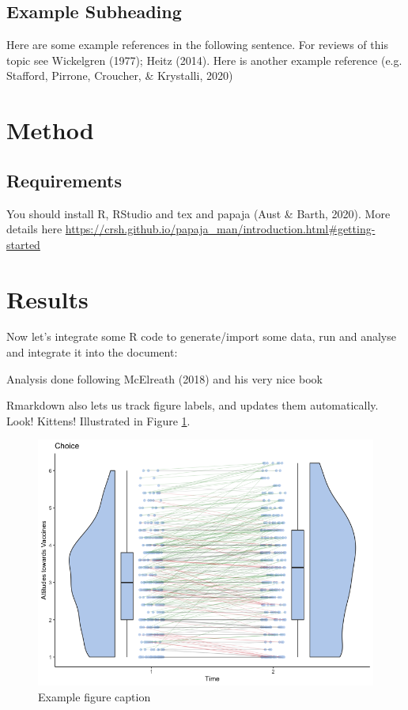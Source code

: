 \documentclass[
  english,
  ,jou,floatsintext]{apa6}
\begin{document}
\hypertarget{example-subheading}{%
\subsection{Example Subheading}\label{example-subheading}}

Here are some example references in the following sentence. For reviews of this topic see Wickelgren (1977); Heitz (2014). Here is another example reference (e.g. Stafford, Pirrone, Croucher, \& Krystalli, 2020)

\hypertarget{method}{%
\section{Method}\label{method}}

\hypertarget{requirements}{%
\subsection{Requirements}\label{requirements}}

You should install R, RStudio and tex and papaja (Aust \& Barth, 2020). More details here \url{https://crsh.github.io/papaja_man/introduction.html\#getting-started}

\hypertarget{results}{%
\section{Results}\label{results}}

Now let's integrate some R code to generate/import some data, run and analyse and integrate it into the document:

Analysis done following McElreath (2018) and his very nice book

Rmarkdown also lets us track figure labels, and updates them automatically. Look! Kittens! Illustrated in Figure \ref{fig:examplefigurename}.

\begin{figure}

{\centering \includegraphics[width=0.75\linewidth]{../plots/ChoiceViolin} 

}

\caption{Example figure caption}\label{fig:examplefigurename}
\end{figure}
\end{document}
